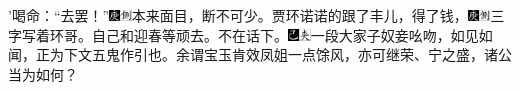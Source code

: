 '喝命：``去罢！''{\includegraphics[width=3mm]{../Images/00004}\includegraphics[width=3mm]{../Images/00011}\footnotesize \kaishu 本来面目，断不可少。}贾环诺诺的跟了丰儿，得了钱，{\includegraphics[width=3mm]{../Images/00004}\includegraphics[width=3mm]{../Images/00011}\footnotesize \kaishu 三字写着环哥。}自己和迎春等顽去。不在话下。{\includegraphics[width=3mm]{../Images/00003}\includegraphics[width=3mm]{../Images/00012}\footnotesize \kaishu 一段大家子奴妾吆吻，如见如闻，正为下文五鬼作引也。余谓宝玉肯效凤姐一点馀风，亦可继荣、宁之盛，诸公当为如何？}

